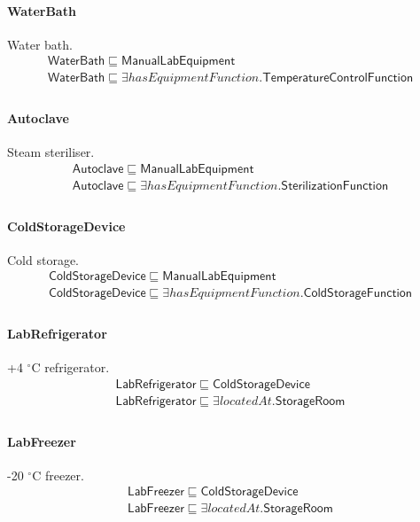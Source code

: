 \documentclass[10pt]{article}
\begin{document}
\paragraph{WaterBath} Water bath.
\[\begin{array}{l}
\mathsf{WaterBath} \sqsubseteq  \mathsf{ManualLabEquipment} \\
\mathsf{WaterBath} \sqsubseteq  \exists \mathit{hasEquipmentFunction}.\mathsf{TemperatureControlFunction} \\
\end{array}\]
\paragraph{Autoclave} Steam steriliser.
\[\begin{array}{l}
\mathsf{Autoclave} \sqsubseteq  \mathsf{ManualLabEquipment} \\
\mathsf{Autoclave} \sqsubseteq  \exists \mathit{hasEquipmentFunction}.\mathsf{SterilizationFunction} \\
\end{array}\]
\paragraph{ColdStorageDevice} Cold storage.
\[\begin{array}{l}
\mathsf{ColdStorageDevice} \sqsubseteq  \mathsf{ManualLabEquipment} \\
\mathsf{ColdStorageDevice} \sqsubseteq  \exists \mathit{hasEquipmentFunction}.\mathsf{ColdStorageFunction} \\
\end{array}\]
\paragraph{LabRefrigerator} +4 $^\circ$C refrigerator.
\[\begin{array}{l}
\mathsf{LabRefrigerator} \sqsubseteq  \mathsf{ColdStorageDevice} \\
\mathsf{LabRefrigerator} \sqsubseteq  \exists \mathit{locatedAt}.\mathsf{StorageRoom} \\
\end{array}\]
\paragraph{LabFreezer} -20 $^\circ$C freezer.
\[\begin{array}{l}
\mathsf{LabFreezer} \sqsubseteq  \mathsf{ColdStorageDevice} \\
\mathsf{LabFreezer} \sqsubseteq  \exists \mathit{locatedAt}.\mathsf{StorageRoom} \\
\end{array}\]
\end{document}
